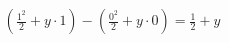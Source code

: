 \documentclass[preview]{standalone}
\begin{document}
\begin{align*}
\left( \frac{1^2}{2} + y \cdot 1 \right) - \left( \frac{0^2}{2} + y \cdot 0 \right) = \frac{1}{2} + y
\end{align*}
\end{document}
